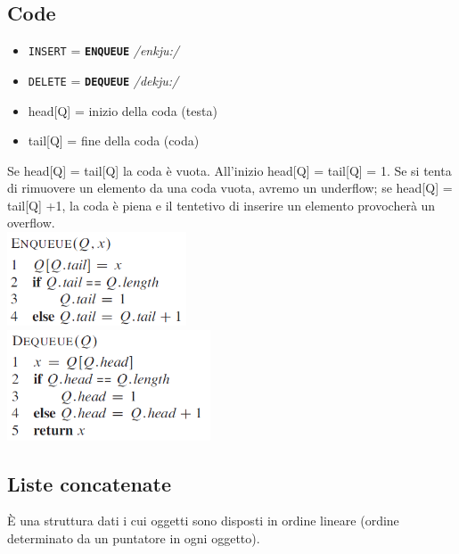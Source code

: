 \documentclass[11pt,a4paper]{article}
\begin{document}
\subsection{Code}
\begin{itemize}[leftmargin=*, noitemsep]
  \item \texttt{INSERT} = \texttt{\textbf{ENQUEUE}} \emph{/enkju:/}
  \item \texttt{DELETE} = \texttt{\textbf{DEQUEUE}} \emph{/dekju:/}
  \item head[Q] = inizio della coda (testa)
  \item tail[Q] = fine della coda (coda)
\end{itemize}
Se head[Q] = tail[Q] la coda è vuota. All’inizio head[Q] = tail[Q] = 1. Se si tenta di rimuovere un elemento da una coda vuota, avremo un underflow; se head[Q] = tail[Q] +1, la coda è piena e il tentetivo di inserire un elemento provocherà un overflow.\medskip\\
\includegraphics[scale=0.7]{img/coda1.png}\ \ \ \ \ \ \ \ \ \ \ \ \ \ \
\includegraphics[scale=0.7]{img/coda2.png}

\subsection{Liste concatenate}
È una struttura dati i cui oggetti sono disposti in ordine lineare (ordine determinato da un puntatore in ogni oggetto).
\end{document}

